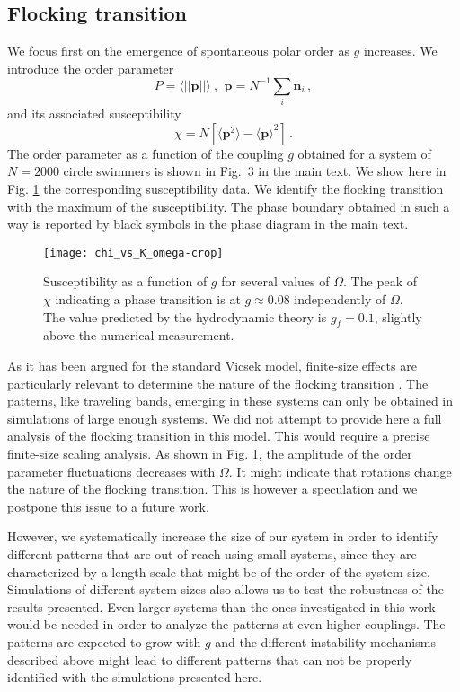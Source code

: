 \documentclass[aps,twocolumn,showlabels,showrefs,amsmath,amssymb,pre,superscriptaddress, floatfix, colors]{revtex4}
\newcommand{\1}{\begin{equation}}
\newcommand{\2}{\end{equation}}
\newcommand{\4}[2]{{\frac{#1}{#2}}}
\begin{document}
\subsection{Flocking transition}
We focus first on the emergence of spontaneous polar order  as $g$ increases. We introduce the order parameter
\begin{equation}
P=\langle||\boldsymbol{p}||\rangle \ ,\, \  \boldsymbol{p}=N^{-1}\sum_i \boldsymbol{n}_i \, , 
\end{equation} 
and its  associated susceptibility
\begin{equation}
\chi=N\left[\langle\boldsymbol{p}^2\rangle-\langle\boldsymbol{p}\rangle^2\right] \, .
\end{equation}
The order parameter as a function of the coupling $g$ obtained for a system of $N=2000$ circle swimmers is shown in Fig.~3 in the main text. We show here in Fig. \ref{fig:chi} the corresponding susceptibility data. We identify the flocking transition with the maximum of the susceptibility. The phase boundary obtained in such a way is reported by black symbols in the phase diagram in the main text. 

\begin{figure}
\begin{center}
\texttt{[image: chi\_vs\_K\_omega-crop]}
\end{center}
\caption{Susceptibility as a function of $g$ for several values of $\Omega$.  The peak of $\chi$ indicating a phase transition is at $g\approx 0.08$ independently of $\Omega$. The value predicted by the hydrodynamic theory is $g_f=0.1$, slightly above the numerical measurement. } 
\label{fig:chi}
\end{figure}

 As it has been argued for the standard Vicsek model, finite-size effects are particularly relevant to determine the nature of the flocking transition \cite{VicsekRevsm}. The patterns, like traveling bands,  emerging in these systems can only be obtained in simulations of large enough systems. We did not attempt to provide here a full analysis of the flocking transition in this model.  This would require a precise finite-size scaling analysis. 
 As shown in Fig. \ref{fig:chi}, the amplitude of the order parameter fluctuations decreases with $\Omega$. It might indicate that rotations change the nature of the flocking transition. This is however a speculation and we postpone this issue to a future work. 
 
However, we systematically increase the size of our system in order to identify different patterns that are out of reach using small systems, since they are characterized by a length scale that might be of the order of the system size. Simulations of different system sizes also allows us to test the robustness of the results presented. Even larger systems than the ones investigated in this work would be needed in order to analyze the patterns at even higher couplings. The patterns are expected to grow with $g$ and the different instability mechanisms described above might lead to different patterns that can not be  properly identified with the simulations presented here.    
 
\end{document}
